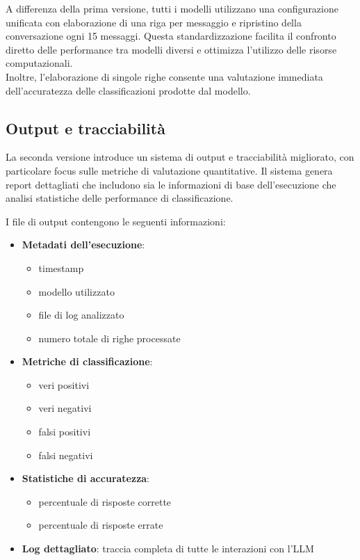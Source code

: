 \documentclass[12pt]{report}
\begin{document}
A differenza della prima versione, tutti i modelli utilizzano una configurazione unificata con elaborazione di una riga per messaggio e ripristino della conversazione ogni 15 messaggi. Questa standardizzazione facilita il confronto diretto delle performance tra modelli diversi e ottimizza l'utilizzo delle risorse computazionali. \\
Inoltre, l'elaborazione di singole righe consente una valutazione immediata dell'accuratezza delle classificazioni prodotte dal modello.

\subsection{Output e tracciabilità}
\label{subsec:ver2_output}

La seconda versione introduce un sistema di output e tracciabilità migliorato, con particolare focus sulle metriche di valutazione quantitative. Il sistema genera report dettagliati che includono sia le informazioni di base dell'esecuzione che analisi statistiche delle performance di classificazione.

I file di output contengono le seguenti informazioni:
\begin{itemize}
    \item \textbf{Metadati dell'esecuzione}:
          \begin{itemize}
              \item timestamp
              \item modello utilizzato
              \item file di log analizzato
              \item numero totale di righe processate
          \end{itemize}
    \item \textbf{Metriche di classificazione}:
          \begin{itemize}
              \item veri positivi
              \item veri negativi
              \item falsi positivi
              \item falsi negativi
          \end{itemize}
    \item \textbf{Statistiche di accuratezza}:
          \begin{itemize}
              \item percentuale di risposte corrette
              \item percentuale di risposte errate
          \end{itemize}
    \item \textbf{Log dettagliato}: traccia completa di tutte le interazioni con l'LLM
\end{itemize}
\end{document}
